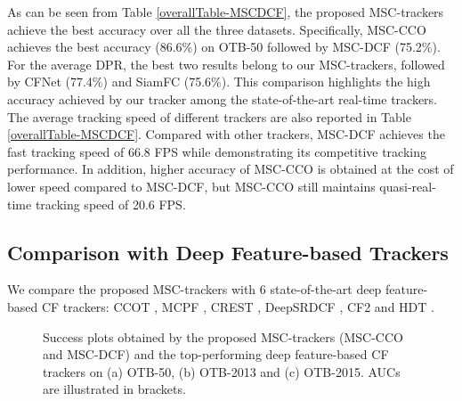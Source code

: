 \documentclass[runningheads]{llncs}
\begin{document}
As can be seen from Table \ref{overallTable-MSCDCF}, the proposed MSC-trackers achieve the best accuracy over all the three datasets. Specifically, MSC-CCO achieves the best accuracy (86.6\%) on OTB-50 followed by MSC-DCF (75.2\%). For the average DPR, the best two results belong to our MSC-trackers, followed by CFNet (77.4\%) and SiamFC (75.6\%). This comparison highlights the high accuracy achieved by our tracker among the state-of-the-art real-time trackers. The average tracking speed of different trackers are also reported in Table \ref{overallTable-MSCDCF}. Compared with other trackers, MSC-DCF achieves the fast tracking speed of 66.8 FPS while demonstrating its competitive tracking performance. In addition, higher accuracy of MSC-CCO is obtained at the cost of lower speed compared to MSC-DCF, but MSC-CCO still maintains quasi-real-time tracking speed of 20.6 FPS.







\subsection{Comparison with Deep Feature-based Trackers}
We compare the proposed MSC-trackers with 6 state-of-the-art deep feature-based CF trackers: CCOT \cite{CCOT}, MCPF \cite{MCPF}, CREST \cite{CREST}, DeepSRDCF \cite{DeepSRDCF}, CF2 \cite{HCF} and HDT \cite{HDT}. 








\begin{figure*}[!tp]
 \begin{center}
\end{center}
\vfill
   \caption{\label{MSC-CCO-overall} Success plots obtained by the proposed MSC-trackers (MSC-CCO and MSC-DCF) and the top-performing deep feature-based CF trackers on (a) OTB-50, (b) OTB-2013 and (c) OTB-2015.  AUCs are illustrated in brackets. } 
\end{figure*}
\end{document}
